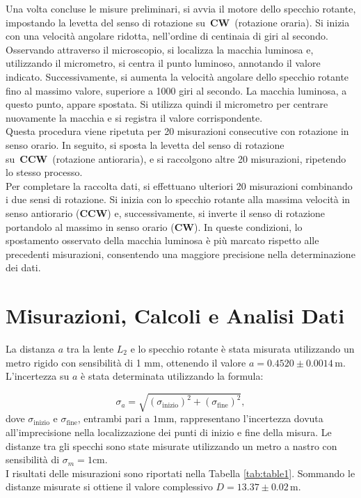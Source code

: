 \documentclass{article}
\begin{document}
Una volta concluse le misure preliminari, si avvia il motore dello specchio rotante, impostando la levetta del senso di rotazione su \textbf{CW} (rotazione oraria). Si inizia con una velocità angolare ridotta, nell’ordine di centinaia di giri al secondo. Osservando attraverso il microscopio, si localizza la macchia luminosa e, utilizzando il micrometro, si centra il punto luminoso, annotando il valore indicato. Successivamente, si aumenta la velocità angolare dello specchio rotante fino al massimo valore, superiore a 1000 giri al secondo. La macchia luminosa, a questo punto, appare spostata. Si utilizza quindi il micrometro per centrare nuovamente la macchia e si registra il valore corrispondente.\\
Questa procedura viene ripetuta per 20 misurazioni consecutive con rotazione in senso orario. In seguito, si sposta la levetta del senso di rotazione su \textbf{CCW} (rotazione antioraria), e si raccolgono altre 20 misurazioni, ripetendo lo stesso processo.\\
Per completare la raccolta dati, si effettuano ulteriori 20 misurazioni combinando i due sensi di rotazione. Si inizia con lo specchio rotante alla massima velocità in senso antiorario (\textbf{CCW}) e, successivamente, si inverte il senso di rotazione portandolo al massimo in senso orario (\textbf{CW}). In queste condizioni, lo spostamento osservato della macchia luminosa è più marcato rispetto alle precedenti misurazioni, consentendo una maggiore precisione nella determinazione dei dati.




\section{Misurazioni, Calcoli e Analisi Dati}

La distanza $a$ tra la lente \(L_2\) e lo specchio rotante è stata misurata utilizzando un metro rigido con sensibilità di 1 mm, ottenendo il valore \(a = 0.4520 \pm 0.0014 \, \text{m}\). 
L'incertezza su $a$ è stata determinata utilizzando la formula:

\begin{equation}
\sigma_\text{\(a\)} = \sqrt{(\sigma_{\text{inizio}})^2 + (\sigma_{\text{fine}})^2},
\end{equation}
dove \(\sigma_{\text{inizio}}\) e \(\sigma_{\text{fine}}\), entrambi pari a \(1 \text{mm}\), rappresentano l'incertezza dovuta all'imprecisione nella localizzazione dei punti di inizio e fine della misura.
Le distanze tra gli specchi sono state misurate utilizzando un metro a nastro con sensibilità di \(\sigma_m=1\text{cm}\). \\
I risultati delle misurazioni sono riportati nella Tabella \ref{tab:table1}. 
Sommando le distanze misurate si ottiene il valore complessivo \(D = 13.37 \pm 0.02 \, \text{m}\).
\end{document}
